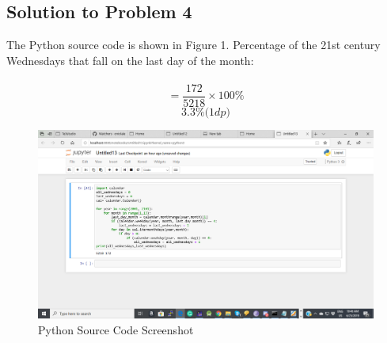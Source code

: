 \documentclass{article}
\begin{document}
\subsection{Solution to Problem 4}
The Python source code is shown in Figure 1. Percentage of the 21st century Wednesdays that fall on the last day of the month: \\\\
$$ = \frac{172}{5218} \times 100 \% $$
$$ 3.3\%  \textit{(1dp)}$$
\begin{figure}[H]
	\centering
	\includegraphics[width=1.2\linewidth, height=0.6\textheight]{pythonCode}
	\caption{Python Source Code Screenshot}
	\label{fig:pythoncode}
\end{figure}
\end{document}
